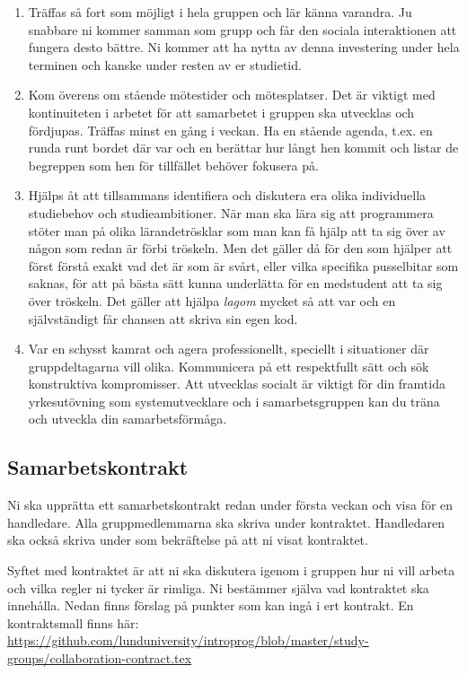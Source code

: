 \begin{enumerate}
\item Träffas så fort som möjligt i hela gruppen och lär känna varandra. Ju snabbare ni kommer samman som grupp och får den sociala interaktionen att fungera desto bättre. Ni kommer att ha nytta av denna investering under hela terminen och kanske under resten av er studietid.
\item Kom överens om stående mötestider och mötesplatser. Det är viktigt med kontinuiteten i arbetet för att samarbetet i gruppen ska utvecklas och fördjupas. Träffas minst en gång i veckan. Ha en stående agenda, t.ex. en runda runt bordet där var och en berättar hur långt hen kommit och listar de begreppen som hen för tillfället behöver fokusera på.
\item Hjälps åt att tillsammans identifiera och diskutera era olika individuella studiebehov och studieambitioner. När man ska lära sig att programmera stöter man på olika lärandetrösklar som man kan få hjälp att ta sig över av någon som redan är förbi tröskeln. Men det gäller då för den som hjälper att först förstå exakt vad det är som är svårt, eller vilka specifika pusselbitar som saknas, för att på bästa sätt kunna underlätta för en medstudent att ta sig över tröskeln. Det gäller att hjälpa \emph{lagom} mycket så att var och en självständigt får chansen att skriva sin egen kod.
\item Var en schysst kamrat och agera professionellt, speciellt i situationer där gruppdeltagarna vill olika. Kommunicera på ett respektfullt sätt och sök konstruktiva kompromisser. Att utvecklas socialt är viktigt för din framtida yrkesutövning som systemutvecklare och i samarbetsgruppen kan du träna och utveckla din samarbetsförmåga.
\end{enumerate}

\subsection{Samarbetskontrakt}

Ni ska upprätta ett samarbetskontrakt redan under första veckan och visa för en handledare. Alla gruppmedlemmarna ska skriva under kontraktet. Handledaren ska också skriva under som bekräftelse på att ni visat kontraktet.

Syftet med kontraktet är att ni ska diskutera igenom i gruppen hur ni vill arbeta och vilka regler ni tycker är rimliga. Ni bestämmer själva vad kontraktet ska innehålla. Nedan finns förslag på punkter som kan ingå i ert kontrakt. En kontraktsmall finns här: \url{https://github.com/lunduniversity/introprog/blob/master/study-groups/collaboration-contract.tex}


